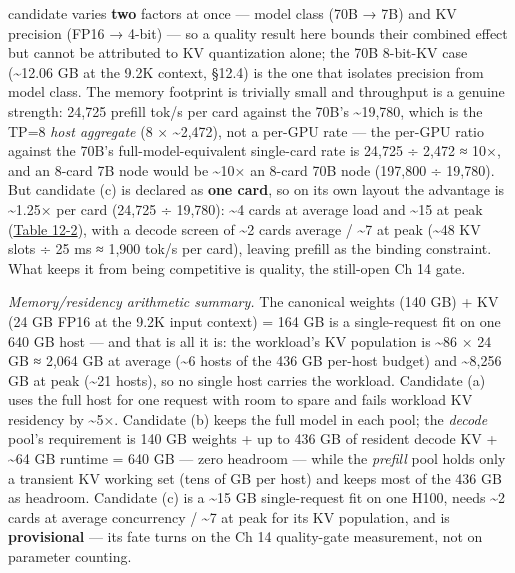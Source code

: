 candidate varies \textbf{two} factors at once --- model class (70B → 7B)
and KV precision (FP16 → 4-bit) --- so a quality result here bounds
their combined effect but cannot be attributed to KV quantization alone;
the 70B 8-bit-KV case (\textasciitilde12.06 GB at the 9.2K context,
§12.4) is the one that isolates precision from model class. The memory
footprint is trivially small and throughput is a genuine strength:
24,725 prefill tok/s per card against the 70B's \textasciitilde19,780,
which is the TP=8 \emph{host aggregate} (8 × \textasciitilde2,472), not
a per-GPU rate --- the per-GPU ratio against the 70B's
full-model-equivalent single-card rate is 24,725 ÷ 2,472 ≈ 10×, and an
8-card 7B node would be \textasciitilde10× an 8-card 70B node (197,800 ÷
19,780). But candidate (c) is declared as \textbf{one card}, so on its
own layout the advantage is \textasciitilde1.25× per card (24,725 ÷
19,780): \textasciitilde4 cards at average load and \textasciitilde15 at
peak (\hyperref[tab:12.2]{Table 12-2}), with a decode screen of \textasciitilde2 cards
average / \textasciitilde7 at peak (\textasciitilde48 KV slots ÷ 25 ms ≈
1,900 tok/s per card), leaving prefill as the binding constraint. What
keeps it from being competitive is quality, the still-open Ch 14 gate.

\emph{Memory/residency arithmetic summary.} The canonical weights (140
GB) + KV (24 GB FP16 at the 9.2K input context) = 164 GB is a
single-request fit on one 640 GB host --- and that is all it is: the
workload's KV population is \textasciitilde86 × 24 GB ≈ 2,064 GB at
average (\textasciitilde6 hosts of the 436 GB per-host budget) and
\textasciitilde8,256 GB at peak (\textasciitilde21 hosts), so no single
host carries the workload. Candidate (a) uses the full host for one
request with room to spare and fails workload KV residency by
\textasciitilde5×. Candidate (b) keeps the full model in each pool; the
\emph{decode} pool's requirement is 140 GB weights + up to 436 GB of
resident decode KV + \textasciitilde64 GB runtime = 640 GB --- zero
headroom --- while the \emph{prefill} pool holds only a transient KV
working set (tens of GB per host) and keeps most of the 436 GB as
headroom. Candidate (c) is a \textasciitilde15 GB single-request fit on
one H100, needs \textasciitilde2 cards at average concurrency /
\textasciitilde7 at peak for its KV population, and is
\textbf{provisional} --- its fate turns on the Ch 14 quality-gate
measurement, not on parameter counting.

\label{measurement}



